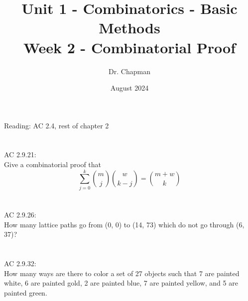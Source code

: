 \documentclass{article}
\title{Unit 1 - Combinatorics - Basic Methods\\ Week 2 - Combinatorial Proof}
\author{Dr. Chapman}
\date{August 2024}
\begin{document}
\maketitle
Reading: AC 2.4, rest of chapter 2
\section{}
AC 2.9.21:\\
Give a combinatorial proof that \[\sum^k_{j=0}\binom{m}{j}\binom{w}{k-j}=\binom{m+w}{k}\]
\section{}
AC 2.9.26:\\
How many lattice paths go from (0, 0) to (14, 73) which do not go through (6, 37)?
\section{}
AC 2.9.32:\\
How many ways are there to color a set of 27 objects such that 7 are painted white, 6 are painted gold, 2
are painted blue, 7 are painted yellow, and 5 are painted green.
\end{document}
